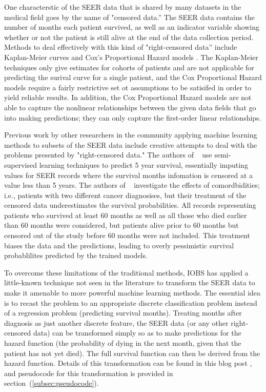 \documentclass[a4paper,11pt]{article}
\begin{document}
One characterstic of the SEER data that is shared by many datasets in the medical field 
goes by the name of "censored data.'' The SEER data contains the number of months each patient survived, as well as an indicator variable showing whether or not the patient is still alive at the end of the data collection period.
Methods to deal effectively with this kind of "right-censored data'' include Kaplan-Meier curves
and Cox's Proportional Hazard models \cite{cam}. The Kaplan-Meier techniques only give estimates for cohorts of patients and are not applicable for predicting the surival curve for a single patient, and the Cox Proportional Hazard models require a fairly restrictive set ot assumptions to be satisifed in order to yield reliable results. In addition, the Cox Proportional Hazard models are not able to capture the nonlinear relationships between the given data fields that go into making predictions; they can only capture the first-order linear relationships.

Previous work by other researchers in the community applying machine learning methods to subsets of the SEER data include creative attempts to deal with the problems presented by  "right-censored data." The authors of ~\cite{ISI:000337467400005} use semi-supervised learning techniques to predict 5 year survival, essentially imputing values for SEER records where the survival months infomation is censored at a value less than 5 years. The authors of ~\cite{ISI:000355882700012} investigate the effects of comordbidities; i.e., patients with two different cancer diagnosises, but their treatment of the censored data underestimates the survival probabilities. All records representing patients who survived at least 60 months as well as all those who died earlier than 60 months were considered, but patients alive prior to 60 months but censored out of the study before 60 months were not included. This treatment biases the data and the predictions, leading to overly pessimistic survival probablilites predicted by the trained models.



To overcome these limitations of the traditional methods, IOBS has applied a little-known technique not seen in the literature to transform the SEER data to make it amenable to more powerful machine learning methods. The essential idea is to recast the problem to an appropriate discrete classification problem instead of a regression problem (predicting survival months). Treating months after diagnosis as just another discrete feature, the SEER data (or any other right-censored data) can be transformed simply so as to make predictions for the hazard function
 (the probability of dying in the next month, given that the patient has not yet died).
The full survival function can then be derived from the hazard function.
Details of this transformation can be found in this blog post \cite{kuhn}, and pseudocode for this transformation is provided in section~(\ref{subsec:pseudocode}).
\end{document}
